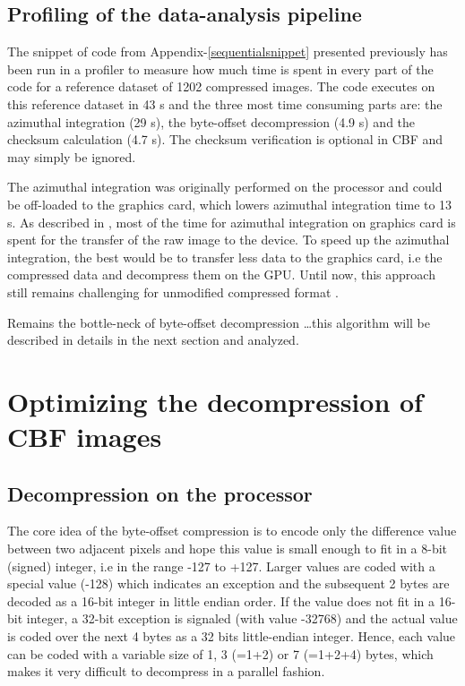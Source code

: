 \documentclass[preprint]{iucr}              %
\begin{document}
\subsection{Profiling of the data-analysis pipeline}

The snippet of code from Appendix-\ref{sequentialsnippet} presented previously has been run in a profiler to
measure how much time is spent in every part of the code for a reference
dataset of 1202 compressed images.
The code executes on this reference dataset in 43 s and the
three most time consuming parts are: the azimuthal integration (29 s), the
byte-offset decompression (4.9 s) and the checksum calculation (4.7 s).
The checksum verification is optional in CBF and may simply be ignored.

The azimuthal integration was originally performed on the processor and could be
off-loaded to the graphics card, which lowers azimuthal integration time to 13 s.
As described in \cite{kieffer_ashiotis-proc-euroscipy-2014}, most of the time
for azimuthal integration on graphics card is spent for the transfer of the raw 
image to the device.
To speed up the azimuthal integration, the best would be to transfer less data
to the graphics card, i.e the compressed data and decompress them on the GPU.
Until now, this approach still remains challenging for unmodified compressed
format \cite{gompresso}.

Remains the bottle-neck of byte-offset decompression \ldots this algorithm will
be described in details in the next section and analyzed. 

\section{Optimizing the decompression of CBF images}

\subsection{Decompression on the processor}

The core idea of the byte-offset compression is to encode only the difference
value between two adjacent pixels and hope this value is small enough to fit in
a 8-bit (signed) integer, i.e in the range -127 to +127.
Larger values are coded with a special value (-128) which indicates an exception
and the subsequent 2 bytes are decoded as a 16-bit integer in little endian
order.
If the value does not fit in a 16-bit integer, a 32-bit exception is
signaled (with value -32768) and the actual value is coded over the next 4 bytes
as a 32 bits little-endian integer.
Hence, each value can be coded with a variable size of 1, 3 (=1+2) or 7 (=1+2+4)
bytes, which makes it very difficult to decompress in a parallel fashion.
\end{document}
